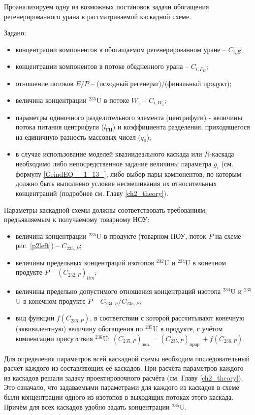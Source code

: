 {Проанализируем одну из возможных постановок задачи обогащения регенерированного урана в рассматриваемой каскадной схеме.

Задано:

\begin{itemize}
    \item концентрации компонентов в обогащаемом регенерированном уране -- $C_{i,{E}}$;
    \item концентрации компонентов в потоке обедненного урана -- $C_{i,{F_{D}}}$;
    \item отношение потоков $E/P$ -- (исходный регенерат)/(финальный продукт);
    \item величина концентрации $^{235}$U в потоке $W_{1}$ -- $C_{i,{W_1}}$;
    \item параметры одиночного разделительного элемента (центрифуги) - величины потока питания центрифуги ($l_{ГЦ}$) и коэффициента разделения, приходящегося на единичную разность массовых чисел ($q_{0}$);
    \item в случае использование моделей квазиидеального каскада или $R$-каскада необходимо либо непосредственное задание величины параметра $g_i$ (см. формулу \ref{GrindEQ__1_13_}, либо выбор пары компонентов, по которым должно быть выполнено условие несмешивания их относительных концентраций (подробнее см. Главу \ref{ch2_theory}).
\end{itemize}

Параметры каскадной схемы должны соответствовать требованиям, предъявляемым к получаемому товарному НОУ:

\begin{itemize}
    \item величина концентрации $^{235}$U в продукте (товарном НОУ, поток $P$ на схеме рис. \ref{p2left}) -- $C_{235,{P}}$;
    \item величины предельных концентраций изотопов $^{232}$U и $^{234}$U в конечном продукте $P$ -- $(C_{232,{P}})_{lim}$;
    \item величины предельно допустимого отношения концентраций изотопа $^{234}$U и $^{235}$U в конечном продукте $P$ -- ${C_{234,{P}}}/{C_{235,{P}}}$;
    \item вид функции $f(C_{236,P})$, в соответствии с которой рассчитывают конечную (эквивалентную) величину обогащения по $^{235}$U в продукте, с учётом компенсации присутствия $^{236}$U:
    $(C_{235,P})_\textit{экв.}=(C_{235,P})_\textit{прир.}+f(C_{236,P})$.    
\end{itemize}

Для определения параметров всей каскадной схемы необходим последовательный расчёт каждого из составляющих её каскадов. При расчёта параметров каждого из каскадов решали задачу проектировочного расчёта (см. Главу \ref{ch2_theory}). Это означало, что задаваемыми параметрами для каждого из каскадов в схеме были концентрации одного из изотопов в выходящих потоках этого каскада. Причём для всех каскадов удобно задать концентрации $^{235}$U.

}
